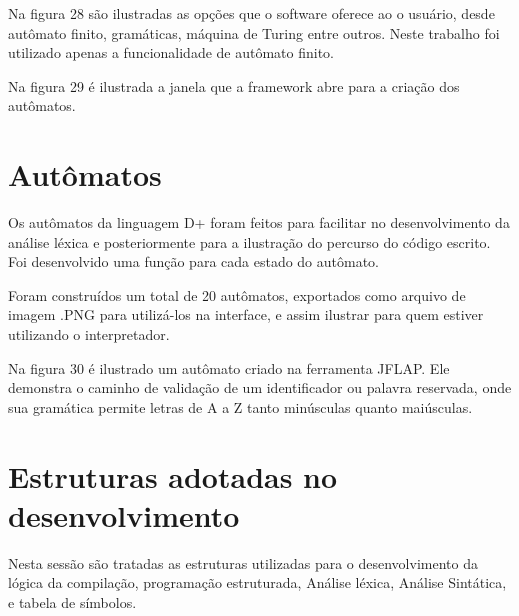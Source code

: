 \documentclass[12pt,oneside,a4paper,chapter=TITLE,section=TITLE,sumario=tradicional]{abntex2}
\begin{document}
Na figura 28 são ilustradas as opções que o software oferece ao o usuário, desde autômato finito, gramáticas, máquina de Turing entre outros. Neste trabalho foi utilizado apenas a funcionalidade de autômato finito.

\begin{figure}[htb]
\end{figure} 

Na figura 29 é ilustrada a janela que a framework abre para a criação dos autômatos.

\begin{figure}[htb]
\end{figure}

\section{Autômatos}
\label{sec:automatosmet}

Os autômatos da linguagem D+ foram feitos para facilitar no desenvolvimento da análise léxica e posteriormente para a ilustração do percurso do código escrito. Foi desenvolvido uma função para cada estado do autômato.

Foram construídos um total de 20 autômatos, exportados como arquivo de imagem .PNG para utilizá-los na interface, e assim ilustrar para quem estiver utilizando o interpretador.

Na figura 30 é ilustrado um autômato criado na ferramenta JFLAP. Ele demonstra o caminho de validação de um identificador ou palavra reservada, onde sua gramática permite letras de A a Z tanto minúsculas quanto maiúsculas.

\begin{figure}[htb]
\end{figure}

\section{Estruturas adotadas no desenvolvimento}
\label{sec:estruturasadotadas}

Nesta sessão são tratadas as estruturas utilizadas para o desenvolvimento da lógica da compilação, programação estruturada, Análise léxica, Análise Sintática, e tabela de símbolos.
\end{document}
